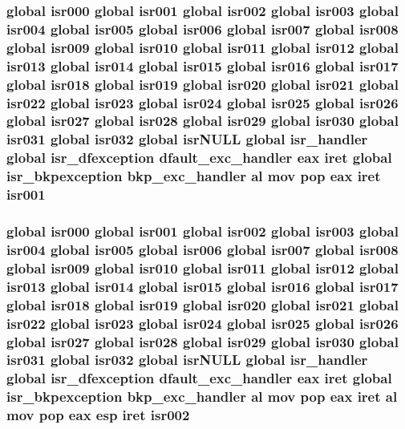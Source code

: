 \subsubsection[{\texorpdfstring{isr001}{isr001}}]{\setlength{\rightskip}{0pt plus 5cm}global {\bf isr000} global isr001 global {\bf isr002} global {\bf isr003} global {\bf isr004} global {\bf isr005} global {\bf isr006} global {\bf isr007} global {\bf isr008} global {\bf isr009} global {\bf isr010} global {\bf isr011} global {\bf isr012} global {\bf isr013} global {\bf isr014} global {\bf isr015} global {\bf isr016} global {\bf isr017} global {\bf isr018} global {\bf isr019} global {\bf isr020} global {\bf isr021} global {\bf isr022} global {\bf isr023} global {\bf isr024} global {\bf isr025} global {\bf isr026} global {\bf isr027} global {\bf isr028} global {\bf isr029} global {\bf isr030} global {\bf isr031} global isr032 global isr\+N\+U\+LL global isr\+\_\+handler global {\bf isr\+\_\+dfexception} {\bf dfault\+\_\+exc\+\_\+handler} eax iret global {\bf isr\+\_\+bkpexception} {\bf bkp\+\_\+exc\+\_\+handler} {\bf al} {\bf mov} pop eax iret isr001}\hypertarget{isrs_8as_a7ad0a084dcb9817465bd31a1504cb5f9}{}\label{isrs_8as_a7ad0a084dcb9817465bd31a1504cb5f9}
\subsubsection[{\texorpdfstring{isr002}{isr002}}]{\setlength{\rightskip}{0pt plus 5cm}global {\bf isr000} global {\bf isr001} global isr002 global {\bf isr003} global {\bf isr004} global {\bf isr005} global {\bf isr006} global {\bf isr007} global {\bf isr008} global {\bf isr009} global {\bf isr010} global {\bf isr011} global {\bf isr012} global {\bf isr013} global {\bf isr014} global {\bf isr015} global {\bf isr016} global {\bf isr017} global {\bf isr018} global {\bf isr019} global {\bf isr020} global {\bf isr021} global {\bf isr022} global {\bf isr023} global {\bf isr024} global {\bf isr025} global {\bf isr026} global {\bf isr027} global {\bf isr028} global {\bf isr029} global {\bf isr030} global {\bf isr031} global isr032 global isr\+N\+U\+LL global isr\+\_\+handler global {\bf isr\+\_\+dfexception} {\bf dfault\+\_\+exc\+\_\+handler} eax iret global {\bf isr\+\_\+bkpexception} {\bf bkp\+\_\+exc\+\_\+handler} {\bf al} {\bf mov} pop eax iret {\bf al} {\bf mov} pop eax esp iret isr002}\hypertarget{isrs_8as_a742ef4476754e69a58f96279406e5d92}{}\label{isrs_8as_a742ef4476754e69a58f96279406e5d92}
